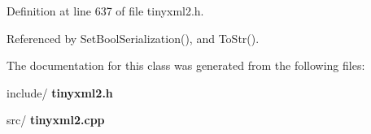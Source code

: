 Definition at line 637 of file tinyxml2.\+h.



Referenced by Set\+Bool\+Serialization(), and To\+Str().



The documentation for this class was generated from the following files\+:\begin{DoxyCompactItemize}
\item 
include/\textbf{ tinyxml2.\+h}\item 
src/\textbf{ tinyxml2.\+cpp}\end{DoxyCompactItemize}
